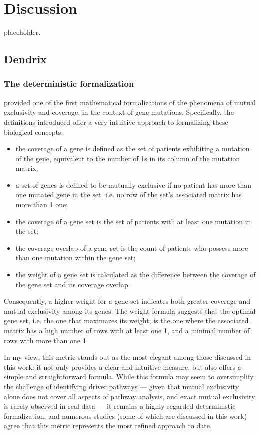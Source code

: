 \chapter{Discussion} \label{chap:discussion}

placeholder. 

\section{Dendrix}

\subsection{The deterministic formalization}

\textcite{dendrix} provided one of the first mathematical formalizations of the phenomena of mutual exclusivity and coverage, in the context of gene mutations. Specifically, the definitions introduced offer a very intuitive approach to formalizing these biological concepts:

\begin{itemize}
    \item the coverage of a gene is defined as the set of patients exhibiting a mutation of the gene, equivalent to the number of 1s in its column of the mutation matrix;
    \item a set of genes is defined to be mutually exclusive if no patient has more than one mutated gene in the set, i.e. no row of the set's associated matrix has more than 1 one;
    \item the coverage of a gene set is the set of patients with at least one mutation in the set;
    \item the coverage overlap of a gene set is the count of patients who possess more than one mutation within the gene set;
    \item the weight of a gene set is calculated as the difference between the coverage of the gene set and its coverage overlap.
\end{itemize}

Consequently, a higher weight for a gene set indicates both greater coverage and mutual exclusivity among its genes. The weight formula suggests that the optimal gene set, i.e. the one that maximazes its weight, is the one where the associated matrix has a high number of rows with at least one 1, and a minimal number of rows with more than one 1.

In my view, this metric stands out as the most elegant among those discussed in this work: it not only provides a clear and intuitive measure, but also offers a simple and straightforward formula. While this formula may seem to oversimplify the challenge of identifying driver pathways --- given that mutual exclusivity alone does not cover all aspects of pathway analysis, and exact mutual exclusivity is rarely observed in real data --- it remains a highly regarded deterministic formalization, and numerous studies (some of which are discussed in this work) agree that this metric represents the most refined approach to date.

